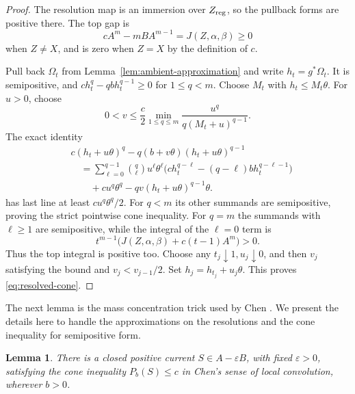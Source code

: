 \documentclass[reqno]{amsart}
\theoremstyle{remark}
\theoremstyle{plain}
\newtheorem{lemma}[thm]{Lemma}
\begin{document}
\begin{proof}
The resolution map is an immersion over \(Z_{\rm reg}\), so the pullback forms are positive there. The top gap is
\[
cA^m-mBA^{m-1}=J(Z,\alpha,\beta )\ge0
\]
when \(Z\ne X\), and is zero when \(Z=X\) by the definition of \(c\).

Pull back \(\Omega_t\) from Lemma~\ref{lem:ambient-approximation} and write \(h_t=g^*\Omega_t\). It is semipositive, and \(ch_t^q-qbh_t^{q-1}\ge0\) for \(1\le q<m\). Choose \(M_t\) with \(h_t\le M_t\theta\). For \(u>0\), choose
\[
0<v\le\frac c2\min_{1\le q\le m}\frac{u^q}{q(M_t+u)^{q-1}}.
\]
The exact identity
\begin{equation}\label{eq:perturbation}
\begin{aligned}
&c(h_t+u\theta)^q-q(b+v\theta)(h_t+u\theta)^{q-1}\\
&\quad=\sum_{\ell=0}^{q-1}\binom q\ell u^\ell\theta^\ell
\bigl(ch_t^{q-\ell}-(q-\ell)bh_t^{q-\ell-1}\bigr)\\
&\qquad+cu^q\theta^q-qv(h_t+u\theta)^{q-1}\theta.
\end{aligned}
\end{equation}
has last line at least \(cu^q\theta^q/2\). For \(q<m\) its other summands are semipositive, proving the strict pointwise cone inequality. For \(q=m\) the summands with \(\ell\ge1\) are semipositive, while the integral of the \(\ell=0\) term is
\[
t^{m-1}\bigl(J(Z,\alpha,\beta)+c(t-1)A^m\bigr)>0.
\] Thus the top integral is positive too. Choose any \(t_j\downarrow1,u_j\downarrow0\), and then \(v_j\) satisfying the bound and \(v_j<v_{j-1}/2\). Set \(h_j=h_{t_j}+u_j\theta\). This proves \eqref{eq:resolved-cone}. 
\end{proof}

The next lemma is the mass concentration trick used by Chen \cite{C21}.  We present the details here to handle the approximations on the resolutions and the cone inequality for semipositive form. 

\begin{samepage}
\begin{lemma}\label{lem:concentration}
There is a closed positive current \(S\in A-\varepsilon B\), with fixed \(\varepsilon>0\), satisfying the cone inequality \(P_b(S)\le c\) in Chen's sense of local convolution,  wherever \(b>0\). 
\end{lemma}
\end{samepage}
\end{document}
